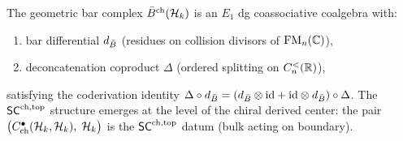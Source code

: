 \begin{theorem}
\label{thm:rosetta-e1-coalgebra}
The geometric bar complex $\bar{B}^{\mathrm{ch}}(\mathcal{H}_k)$ is an
$E_1$ dg coassociative coalgebra with:
\begin{enumerate}[label=\textup{(\roman*)}]
\item bar differential $d_{\bar{B}}$
 \textup{(}residues on collision divisors of\/ $\mathrm{FM}_n(\mathbb{C})$\textup{)},
\item deconcatenation coproduct $\Delta$
 \textup{(}ordered splitting on $C_n^{<}(\mathbb{R})$\textup{)},
\end{enumerate}
satisfying the coderivation identity
$\Delta \circ d_{\bar{B}} = (d_{\bar{B}} \otimes \mathrm{id} + \mathrm{id} \otimes d_{\bar{B}}) \circ \Delta$.
The $\mathsf{SC}^{\mathrm{ch,top}}$ structure emerges at the level of the chiral
derived center: the pair
$\bigl(C^\bullet_{\mathrm{ch}}(\mathcal{H}_k, \mathcal{H}_k),\; \mathcal{H}_k\bigr)$
is the $\mathsf{SC}^{\mathrm{ch,top}}$ datum \textup{(}bulk acting on boundary\textup{)}.
\end{theorem}

